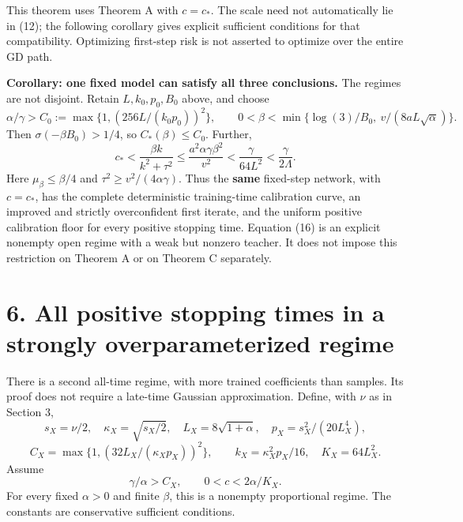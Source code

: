 \documentclass[
  11pt,
  a4paper,
]{article}
\begin{document}
This theorem uses Theorem A with \(c=c_*\). The scale need not
automatically lie in (12); the following corollary gives explicit
sufficient conditions for that compatibility. Optimizing first-step risk
is not asserted to optimize over the entire GD path.

\textbf{Corollary: one fixed model can satisfy all three conclusions.}
The regimes are not disjoint. Retain \(L,k_0,p_0,B_0\) above, and choose
\[
\alpha/\gamma>C_0:=\max\{1,(256L/(k_0p_0))^2\},\qquad
0<\beta<\min\{\log(3)/B_0,\ v/(8aL\sqrt\alpha)\}.
\tag{16}
\] Then \(\sigma(-\beta B_0)>1/4\), so \(C_*(\beta)\le C_0\). Further,
\[
c_*<\frac{\beta k}{k^2+\tau^2}
\le\frac{a^2\alpha\gamma\beta^2}{v^2}
<\frac{\gamma}{64L^2}<\frac{\gamma}{2\Lambda}.
\] Here \(\mu_\beta\le\beta/4\) and \(\tau^2\ge v^2/(4\alpha\gamma)\).
Thus the \textbf{same} fixed-step network, with \(c=c_*\), has the
complete deterministic training-time calibration curve, an improved and
strictly overconfident first iterate, and the uniform positive
calibration floor for every positive stopping time. Equation (16) is an
explicit nonempty open regime with a weak but nonzero teacher. It does
not impose this restriction on Theorem A or on Theorem C separately.

\hypertarget{all-positive-stopping-times-in-a-strongly-overparameterized-regime}{%
\section{6. All positive stopping times in a strongly overparameterized
regime}\label{all-positive-stopping-times-in-a-strongly-overparameterized-regime}}

There is a second all-time regime, with more trained coefficients than
samples. Its proof does not require a late-time Gaussian approximation.
Define, with \(\nu\) as in Section 3, \[
s_X=\nu/2,\quad \kappa_X=\sqrt{s_X/2},\quad
L_X=8\sqrt{1+\alpha},\quad p_X=s_X^2/(20L_X^4),
\] \[
C_X=\max\{1,(32L_X/(\kappa_Xp_X))^2\},\qquad
k_X=\kappa_X^2p_X/16,\quad K_X=64L_X^2.
\] Assume \[
\gamma/\alpha>C_X,\qquad 0<c<2\alpha/K_X. \tag{17}
\] For every fixed \(\alpha>0\) and finite \(\beta\), this is a nonempty
proportional regime. The constants are conservative sufficient
conditions.
\end{document}
